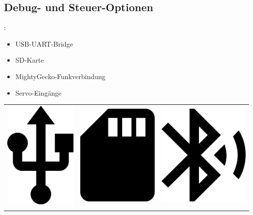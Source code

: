 \documentclass{beamer}
\begin{document}
\subsection{Debug- und Steuer-Optionen}
\begin{frame}{\insertsection: \\ \insertsubsection}
\begin{minipage}{0.45\linewidth}
	\begin{itemize}
		\item USB-UART-Bridge
		\item SD-Karte
		\item MightyGecko-Funkverbindung
		\item Servo-Eingänge
	\end{itemize}
\end{minipage} \quad
\begin{minipage}{0.45\linewidth}
	\centering
	\begin{tabular}{c c c}
		\includegraphics[width=0.2\linewidth]{usb-symbol} & 
		\includegraphics[width=0.2\linewidth]{sd-card} & 
		\includegraphics[width=0.2\linewidth]{bluetooth} \\
		\hspace{0.3 \linewidth} & \hspace{0.3 \linewidth} & \hspace{0.3 \linewidth} \\
	\end{tabular}
\end{minipage}
\end{frame}
\end{document}
